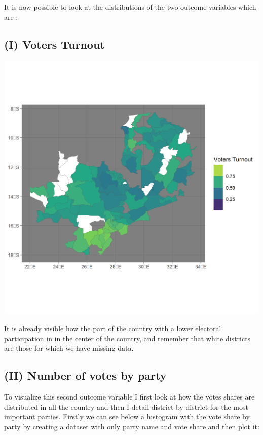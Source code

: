 \documentclass[
]{article}
\begin{document}
It is now possible to look at the distributions of the two outcome
variables which are :

\hypertarget{i-voters-turnout}{%
\subsection{(I) Voters Turnout}\label{i-voters-turnout}}

\includegraphics[width=6.25in,height=5.20833in]{outcome1.png}

It is already visible how the part of the country with a lower electoral
participation in in the center of the country, and remember that white
districts are those for which we have missing data.

\hypertarget{ii-number-of-votes-by-party}{%
\subsection{(II) Number of votes by
party}\label{ii-number-of-votes-by-party}}

To visualize this second outcome variable I first look at how the votes
shares are distributed in all the country and then I detail district by
district for the most important parties. Firstly we can see below a
histogram with the vote share by party by creating a dataset with only
party name and vote share and then plot it:
\end{document}
